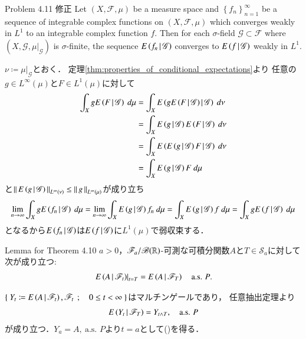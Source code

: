 	\begin{itembox}[l]{Problem 4.11 修正}
		Let $(X,\mathscr{F},\mu)$ be a measure space and  
		$\left\{f_n\right\}_{n=1}^\infty$ be a sequence of integrable complex functions on $(X,\mathscr{F},\mu)$
		which converges weakly in $L^1$ to an integrable complex function $f$.
		Then for each $\sigma$-field $\mathscr{G} \subset \mathscr{F}$
		where $(X,\mathscr{G},\left.\mu\right|_{\mathscr{G}})$ is $\sigma$-finite,
		the sequence $E\left( f_n \, \middle|\, \mathscr{G} \right)$ converges to $E\left( f \, \middle|\, \mathscr{G} \right)$ weakly in $L^1$.
	\end{itembox}
	
	\begin{prf}
		$\nu \coloneqq \left.\mu\right|_{\mathscr{G}}$とおく．
		定理\ref{thm:properties_of_conditional_expectations}より
		任意の$g \in L^\infty(\mu)$と$F \in L^1(\mu)$に対して
		\begin{align}
			\int_X g\cexp{F}{\mathscr{G}}\ d\mu
			&= \int_X \cexp{g\cexp{F}{\mathscr{G}}}{\mathscr{G}}\ d\nu \\
			&= \int_X \cexp{g}{\mathscr{G}}\cexp{F}{\mathscr{G}}\ d\nu \\
			&= \int_X \cexp{\cexp{g}{\mathscr{G}}F}{\mathscr{G}}\ d\nu \\
			&= \int_X \cexp{g}{\mathscr{G}}F\ d\mu
		\end{align}
		と$\left\|\, E\left( g \, \middle|\, \mathscr{G} \right)\, \right\|_{L^\infty(\nu)} \leq \left\|\, g\, \right\|_{L^\infty(\mu)}$が成り立ち
		\begin{align}
			\lim_{n \to \infty} \int_X gE\left( f_n \, \middle|\, \mathscr{G} \right)\ d\mu
			= \lim_{n \to \infty} \int_X E\left( g \, \middle|\, \mathscr{G} \right)f_n\ d\mu
			= \int_X E\left( g \, \middle|\, \mathscr{G} \right)f\ d\mu
			= \int_X gE\left( f \, \middle|\, \mathscr{G} \right)\ d\mu
		\end{align}
		となるから$E\left( f_n \, \middle|\, \mathscr{G} \right)$は$E\left( f \, \middle|\, \mathscr{G} \right)$に$L^1(\mu)$で弱収束する．
		\QED
	\end{prf}
	
	\begin{itembox}[l]{Lemma for Theorem 4.10}
		$a > 0$，$\mathscr{F}_a/\mathscr{B}(\mathbb{R})$-可測な可積分関数$A$と$T \in \mathscr{S}_a$に対して次が成り立つ:
		\begin{align}
			\left. E\left( A \, \middle|\, \mathscr{F}_t \right) \right|_{t = T} = E\left( A \, \middle|\, \mathscr{F}_T \right)
			\quad \mbox{a.s. $P$}.
			\label{eq:lemma_for_theorem_4_10}
		\end{align}
	\end{itembox}
	
	\begin{prf}
		$\left\{\ Y_t \coloneqq E\left( A \, \middle|\, \mathscr{F}_t \right),\mathscr{F}_t\ \, ; \quad 0 \leq t < \infty\ \right\}$はマルチンゲールであり，
		任意抽出定理より
		\begin{align}
			E\left( Y_t \, \middle|\, \mathscr{F}_T \right) = Y_{t \wedge T},
			\quad \mbox{a.s. $P$}
		\end{align}
		が成り立つ．$Y_a = A,\ \mbox{a.s. $P$}$より$t=a$として()を得る．
		\QED
	\end{prf}
	
